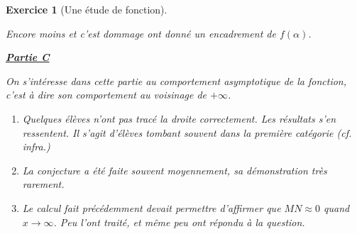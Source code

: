 \documentclass[12pt,a4paper]{article}
\theoremstyle{break}
\theoremstyle{nobreak}
\newtheorem{exercice}{Exercice}
\theoremstyle{nonumberplain}
\begin{document}
\begin{exercice}[Une étude de fonction]
\begin{enumerate}
      Encore moins et c'est dommage ont donné un encadrement de
      $f(\alpha)$.
  \end{enumerate}

  \noindent\textbf{\underline{Partie C}}

  On s'intéresse dans cette partie au comportement asymptotique de la
  fonction, c'est à dire son comportement au voisinage de $+\infty$.

  \begin{enumerate}
    \item Quelques élèves n'ont pas tracé la droite correctement. Les
      résultats s'en ressentent. Il s'agit d'élèves tombant souvent dans
      la première catégorie (cf. infra.)
    \item La conjecture a été faite souvent moyennement, sa
      démonstration très rarement.
    \item Le calcul fait précédemment devait permettre d'affirmer que
      $MN\approx 0$ quand $x\to \infty$. Peu l'ont traité, et même peu
      ont répondu à la question.
  \end{enumerate}

\end{exercice}
\end{document}
